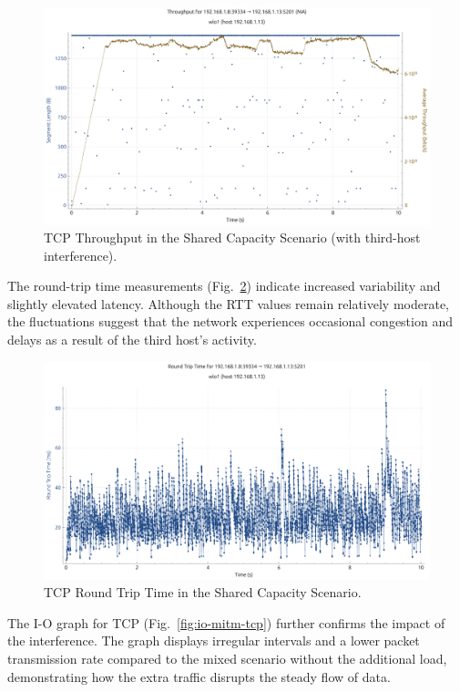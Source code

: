 \begin{enumerate}
    \begin{figure}[ht]
        \centering
        \includegraphics[width=0.9\columnwidth]{images/graphs/Throughput/Throughput_MIX_MITM_TCP.pdf}
        \caption{TCP Throughput in the Shared Capacity Scenario (with third-host interference).}
        \label{fig:throughput-mitm-tcp}
    \end{figure}

    The round-trip time measurements (Fig.~\ref{fig:rtt-mitm-tcp}) indicate increased variability and slightly elevated latency. Although the RTT values remain relatively moderate, the fluctuations suggest that the network experiences occasional congestion and delays as a result of the third host's activity.

    \begin{figure}[ht]
        \centering
        \includegraphics[width=0.9\columnwidth]{images/graphs/RTT/RTT_MIX_MITM_TCP.pdf}
        \caption{TCP Round Trip Time in the Shared Capacity Scenario.}
        \label{fig:rtt-mitm-tcp}
    \end{figure}

    The I-O graph for TCP (Fig.~\ref{fig:io-mitm-tcp}) further confirms the impact of the interference. The graph displays irregular intervals and a lower packet transmission rate compared to the mixed scenario without the additional load, demonstrating how the extra traffic disrupts the steady flow of data.


\end{enumerate}
